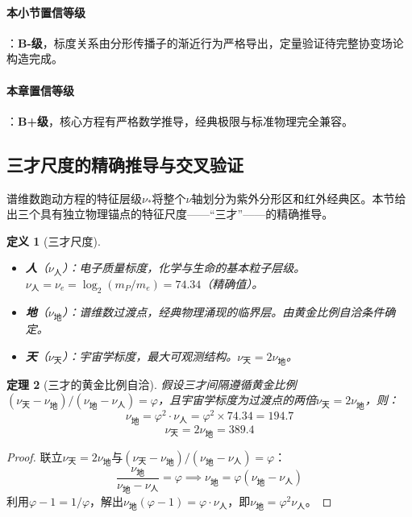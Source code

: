 \documentclass[12pt,a4paper,twocolumn]{article}
\renewcommand{\phi}{\varphi}
\newtheorem{theorem}{定理}[section]
\newtheorem{definition}[theorem]{定义}
\begin{document}
\paragraph{本小节置信等级}：\textbf{B-级}，标度关系由分形传播子的渐近行为严格导出，定量验证待完整协变场论构造完成。

\paragraph{本章置信等级}：\textbf{B+级}，核心方程有严格数学推导，经典极限与标准物理完全兼容。

\subsection{三才尺度的精确推导与交叉验证}
\label{subsec:three_realms}

谱维数跑动方程的特征层级$\nu_*$将整个$\nu$轴划分为紫外分形区和红外经典区。本节给出三个具有独立物理锚点的特征尺度——``三才''——的精确推导。

\begin{definition}[三才尺度]
\begin{itemize}
\item \textbf{人}（$\nu_{\text{人}}$）：电子质量标度，化学与生命的基本粒子层级。$\nu_{\text{人}} = \nu_e = \log_2(m_P/m_e) = 74.34$（精确值）。
\item \textbf{地}（$\nu_{\text{地}}$）：谱维数过渡点，经典物理涌现的临界层。由黄金比例自洽条件确定。
\item \textbf{天}（$\nu_{\text{天}}$）：宇宙学标度，最大可观测结构。$\nu_{\text{天}} = 2\nu_{\text{地}}$。
\end{itemize}
\end{definition}

\begin{theorem}[三才的黄金比例自洽]
\label{thm:three_realms}
假设三才间隔遵循黄金比例$(\nu_{\text{天}} - \nu_{\text{地}})/(\nu_{\text{地}} - \nu_{\text{人}}) = \phi$，且宇宙学标度为过渡点的两倍$\nu_{\text{天}} = 2\nu_{\text{地}}$，则：
\begin{equation}
\nu_{\text{地}} = \phi^2 \cdot \nu_{\text{人}} = \phi^2 \times 74.34 = 194.7
\end{equation}
\begin{equation}
\nu_{\text{天}} = 2\nu_{\text{地}} = 389.4
\end{equation}
\end{theorem}

\begin{proof}
联立$\nu_{\text{天}} = 2\nu_{\text{地}}$与$(\nu_{\text{天}} - \nu_{\text{地}})/(\nu_{\text{地}} - \nu_{\text{人}}) = \phi$：
\[
\frac{\nu_{\text{地}}}{\nu_{\text{地}} - \nu_{\text{人}}} = \phi \implies \nu_{\text{地}} = \phi(\nu_{\text{地}} - \nu_{\text{人}})
\]
利用$\phi - 1 = 1/\phi$，解出$\nu_{\text{地}}(\phi-1) = \phi\cdot\nu_{\text{人}}$，即$\nu_{\text{地}} = \phi^2 \nu_{\text{人}}$。
\end{proof}
\end{document}

